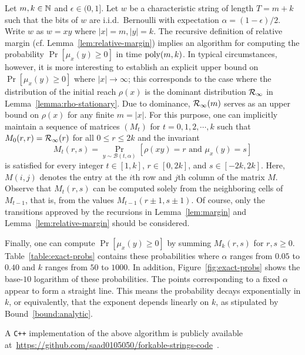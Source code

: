 Let $m, k \in \mathbb{N}$  and $\epsilon \in (0,1]$. 
Let $w$ be a characteristic string of length $T = m + k$ such that 
the bits of $w$ are i.i.d.\ Bernoulli with expectation $\alpha = (1 - \epsilon)/2$. 
Write $w$ as $w = xy$ where $|x| = m, |y| = k$.
The recursive definition of relative margin (cf. Lemma~\ref{lem:relative-margin}) 
implies an algorithm for computing the probability
$\Pr[\mu_x(y) \geq 0]$ in time $\mathrm{poly}(m, k)$. In typical
circumstances, however, it is more interesting to establish an
explicit upper bound on $\Pr[\mu_x(y) \geq 0]$ where
$|x| \rightarrow \infty$; this corresponds to the case where the
distribution of the initial reach $\rho(x)$ is the dominant distribution
$\mathcal{R}_\infty$ in Lemma~\ref{lemma:rho-stationary}. 
Due to dominance, $\mathcal{R}_\infty(m)$ serves as an
upper bound on $\rho(x)$ for any finite $m = |x|$. 
For this purpose, one can implicitly
maintain a sequence of matrices $\left( M_t \right)$ for $t = 0, 1, 2, \cdots, k$
such that $M_0(r, r) = \mathcal{R}_\infty(r)$ for all $0 \leq r \leq 2k$ and
the invariant
\[
  M_t(r, s) = \Pr_{y \sim \mathcal{B}(t, \alpha)}[\rho(xy) = r \text{ and }
  \mu_x(y) = s ]
\]
is satisfied for every integer $t \in [1, k]$,
$r \in [0, 2k]$, and $s \in [-2k, 2k]$. 
Here, $M(i,j)$ denotes the entry at the $i$th row and $j$th column of the matrix $M$.
Observe that $M_t(r,s)$ can be computed solely from the neighboring cells of $M_{t-1}$, that is, 
from the values $M_{t-1}(r\pm 1, s \pm 1)$. 
Of course, only the transitions approved by the recursions in 
Lemma~\ref{lem:margin} and Lemma~\ref{lem:relative-margin} should be considered.

Finally, one can compute $\Pr[\mu_x(y) \geq 0]$ by summing $M_k(r,s)$ for
$r, s \geq 0$. Table~\ref{table:exact-probs} contains these
probabilities where $\alpha$ ranges from $0.05$ to $0.40$ and $k$
ranges from $50$ to $1000$. 
In addition, Figure~\ref{fig:exact-probs} shows the base-$10$ logarithm of
these probabilities. The
points corresponding to a fixed $\alpha$ appear to form a straight
line. This means the probability decays exponentially in $k$, or equivalently, that the exponent 
depends linearly on $k$, 
as stipulated by Bound~\ref{bound:analytic}. 

A \texttt{C++} implementation of the above algorithm is publicly available 
at~\href{https://github.com/saad0105050/forkable-strings-code}{https://github.com/saad0105050/forkable-strings-code}~\cite{PrForkableCode}.


